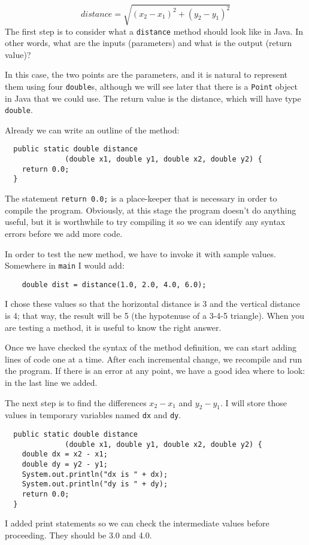 \documentclass{book}
\begin{document}
\begin{equation}
distance = \sqrt{(x_2 - x_1)^2 +(y_2 - y_1)^2}
\end{equation}
%
The first step is to consider what a {\tt distance} method
should look like in Java.  In other words, what are the inputs
(parameters) and what is the output (return value)?

In this case, the two points are the parameters, and it is
natural to represent them using four {\tt double}s, although
we will see later that there is a {\tt Point} object in Java
that we could use.  The return value is the distance, which
will have type {\tt double}.

Already we can write an outline of the method:

\begin{verbatim}
  public static double distance
              (double x1, double y1, double x2, double y2) {
    return 0.0;
  }
\end{verbatim}
%
The statement {\tt return 0.0;} is a place-keeper that is necessary
in order to compile the program.  Obviously, at this stage the
program doesn't do anything useful, but it is worthwhile to
try compiling it so we can identify any syntax errors before
we add more code.

In order to test the new method, we have to invoke it with
sample values.  Somewhere in {\tt main} I would add:

\begin{verbatim}
    double dist = distance(1.0, 2.0, 4.0, 6.0);
\end{verbatim}
%
I chose these values so that the horizontal
distance is 3 and the vertical distance is 4; that way,
the result will be 5 (the hypotenuse of a 3-4-5 triangle).
When you are testing a method, it is useful to know the right
answer.

Once we have checked the syntax of the method definition, we
can start adding lines of code one at a time.  After each
incremental change, we recompile and run the program.  If there is
an error at any point, we have a good idea where to look:
in the last line we added.

The next step is to find the differences
$x_2 - x_1$ and $y_2 - y_1$.  I will store those values in
temporary variables named {\tt dx} and {\tt dy}.

\begin{verbatim}
  public static double distance
              (double x1, double y1, double x2, double y2) {
    double dx = x2 - x1;
    double dy = y2 - y1;
    System.out.println("dx is " + dx);
    System.out.println("dy is " + dy);
    return 0.0;
  }
\end{verbatim}
%
I added print statements so we can check the intermediate values
before proceeding.  They should be 3.0 and 4.0.
\end{document}
